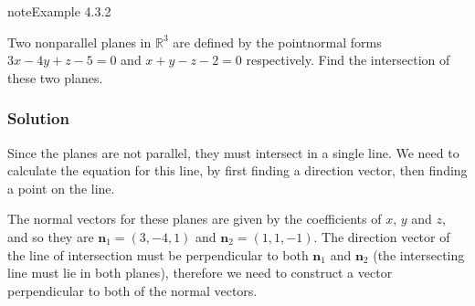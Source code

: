 \documentclass[letterpaper,10pt,english]{jupyterBook}
\begin{document}
\begin{sphinxadmonition}{note}{Example 4.3.2}



\sphinxAtStartPar
Two non\sphinxhyphen{}parallel planes in \(\mathbb{R}^3\) are defined by the point\sphinxhyphen{}normal forms \(3x - 4y + z - 5 = 0\) and \(x + y - z - 2 = 0\) respectively. Find the intersection of these two planes.
\subsubsection*{Solution}

\sphinxAtStartPar
Since the planes are not parallel, they must intersect in a single line. We need to calculate the equation for this line, by first finding a direction vector, then finding a point on the line.

\sphinxAtStartPar
The normal vectors for these planes are given by the coefficients of \(x\), \(y\) and \(z\), and so they are \(\mathbf{n}_1 = (3, -4, 1)\) and \(\mathbf{n}_2 = (1, 1, -1)\). The direction vector of the line of intersection must be perpendicular to both \(\mathbf{n}_1\) and \(\mathbf{n}_2\) (the intersecting line must lie in both planes), therefore we need to construct a vector perpendicular to both of the normal vectors.


\end{sphinxadmonition}
\end{document}
